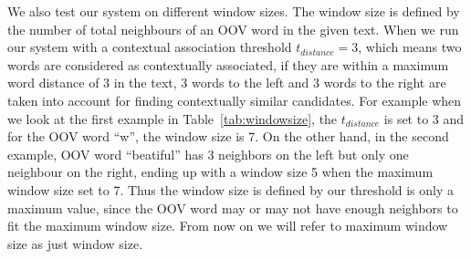 \documentclass[a4paper,onesided,12pt]{report}
\begin{document}
We also test our system on different window sizes. The window size is defined by the number of total neighbours of an OOV word in the given text. When we run our system with a contextual association threshold $t_{distance}=3$, which means two words are considered as contextually associated, if they are within a maximum word distance of 3 in the text, 3 words to the left and 3 words to the right are taken into account for finding contextually similar candidates. For example when we look at the first example in Table~\ref{tab:windowsize}, the $t_{distance}$ is set to 3 and  for the OOV word ``w'', the window size is 7. On the other hand, in the second example, OOV word ``beatiful'' has 3 neighbors on the left but only one neighbour on the right, ending up with a window size 5 when the maximum window size set to 7. Thus the window size is defined by our threshold is only a maximum value, since the OOV word may or may not have enough neighbors to fit the maximum window size. From now on we will refer to maximum window size as just window size.
\end{document}
